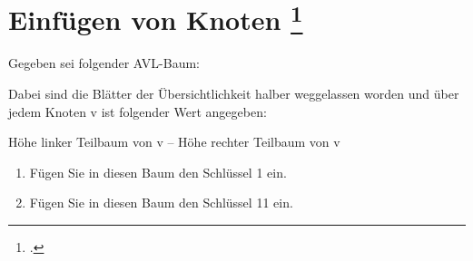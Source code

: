 \documentclass{bschlangaul-aufgabe}
\begin{document}

\section{Einfügen von Knoten
\footcite[Seite 3, Aufgabe 5: AVL-Baum]{aud:ab:7}}

Gegeben sei folgender AVL-Baum:

Dabei sind die Blätter der Übersichtlichkeit halber weggelassen worden
und über jedem Knoten v ist folgender Wert angegeben:

\begin{center}
Höhe linker Teilbaum von v – Höhe rechter Teilbaum von v
\end{center}

\begin{enumerate}


\item Fügen Sie in diesen Baum den Schlüssel 1 ein.


\item Fügen Sie in diesen Baum den Schlüssel 11 ein.

\end{enumerate}
\end{document}
